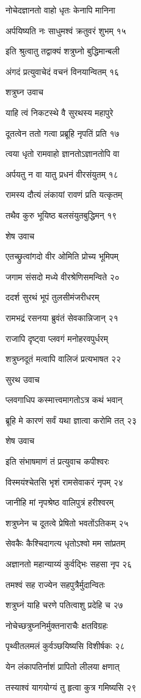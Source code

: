 नोचेदज्ञानतो वाहो धृतः केनापि मानिना

अर्पयिष्यति नः साधुमश्वं क्रतुवरं शुभम् १५

इति श्रुत्वातु तद्वाक्यं शत्रुघ्नो बुद्धिमान्बली

अंगदं प्रत्युवाचेदं वचनं विनयान्वितम् १६

शत्रुघ्न उवाच

याहि त्वं निकटस्थे वै सुरथस्य महापुरे

दूतत्वेन ततो गत्वा प्रब्रूहि नृपतिं प्रति १७

त्वया धृतो रामवाहो ज्ञानतोऽज्ञानतोपि वा

अर्पयतु न वा यातु प्रधनं वीरसंयुतम् १८

रामस्य दौत्यं लंकायां रावणं प्रति यत्कृतम्

तथैव कुरु भूयिष्ठ बलसंयुतबुद्धिमन् १९

शेष उवाच

एतच्छ्रुत्वांगदो वीर ओमिति प्रोच्य भूमिपम्

जगाम संसदो मध्ये वीरश्रेणिसमन्विते २०

ददर्श सुरथं भूपं तुलसीमंजरीधरम्

रामभद्रं रसनया ब्रुवंतं सेवकान्निजान् २१

राजापि दृष्ट्वा प्लवगं मनोहरवपुर्धरम्

शत्रुघ्नदूतं मत्वापि वालिजं प्रत्यभाषत २२

सुरथ उवाच

प्लवगाधिप कस्मात्त्वमागतोऽत्र कथं भवान्

ब्रूहि मे कारणं सर्वं यथा ज्ञात्वा करोमि तत् २३

शेष उवाच

इति संभाषमाणं तं प्रत्युवाच कपीश्वरः

विस्मयंश्चेतसि भृशं रामसेवाकरं नृपम् २४

जानीहि मां नृपश्रेष्ठ वालिपुत्रं हरीश्वरम्

शत्रुघ्नेन च दूतत्वे प्रेषितो भवतोंऽतिकम् २५

सेवकैः कैश्चिदागत्य धृतोऽश्वो मम सांप्रतम्

अज्ञानतो महान्याय्यं कुर्वद्भिः सहसा नृप २६

तमश्वं सह राज्येन सहपुत्रैर्मुदान्वितः

शत्रुघ्नं याहि चरणे पतित्वाशु प्रदेहि च २७

नोचेच्छत्रुघ्ननिर्मुक्तनाराचैः क्षतविग्रहः

पृथ्वीतलमलं कुर्वञ्छयिष्यसि विशीर्षकः २८

येन लंकापतिर्नाशं प्रापितो लीलया क्षणात्

तस्याश्वं यागयोग्यं तु हृत्वा कुत्र गमिष्यसि २९

